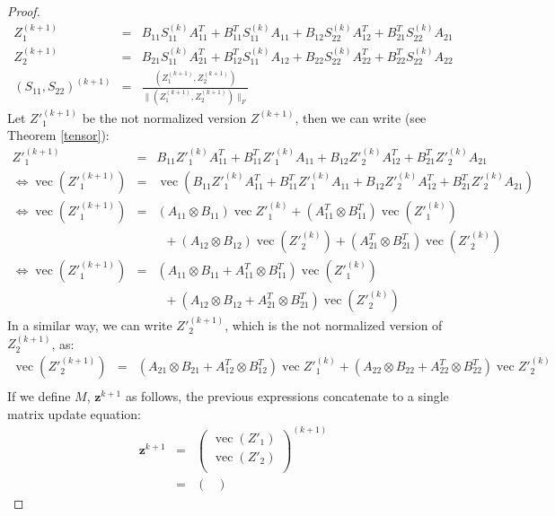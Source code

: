 \documentclass[a4paper,11pt]{report}
\newcommand{\vect}{\operatorname{vec}}
\begin{document}
\begin{proof}
\begin{eqnarray*}
  Z^{(k+1)}_1 &=& B_{11}S^{(k)}_{11}A_{11}^T + B^T_{11}S^{(k)}_{11}A_{11} + B_{12}S^{(k)}_{22}A_{12}^T + B^T_{21}S^{(k)}_{22}A_{21}\\
  Z^{(k+1)}_2 &=& B_{21}S^{(k)}_{11}A_{21}^T + B^T_{12}S^{(k)}_{11}A_{12} + B_{22}S^{(k)}_{22}A_{22}^T + B^T_{22}S^{(k)}_{22}A_{22} \\
 (S_{11}, S_{22})^{(k+1)} &=& \frac{(Z^{(k+1)}_1, Z^{(k+1)}_2)}{\|(Z^{(k+1)}_1, Z^{(k+1)}_2)\|_F}
 \end{eqnarray*}
Let $Z'^{(k+1)}_1$ be the not normalized version $Z^{(k+1)}$, then we can write (see Theorem \ref{tensor}):
\begin{eqnarray*}
  Z'^{(k+1)}_1 &=& B_{11}Z'^{(k)}_1A_{11}^T + B^T_{11}Z'^{(k)}_1A_{11} + B_{12}Z'^{(k)}_2A_{12}^T + B^T_{21}Z'^{(k)}_{2}A_{21}\\
 \Leftrightarrow \vect(Z'^{(k+1)}_1) &=& \vect(B_{11}Z'^{(k)}_1A_{11}^T + B^T_{11}Z'^{(k)}_1A_{11} + B_{12}Z'^{(k)}_2A_{12}^T + B^T_{21}Z'^{(k)}_{2}A_{21})\\
  \Leftrightarrow \vect(Z'^{(k+1)}_1) &=& (A_{11}\otimes B_{11})\vect{Z'^{(k)}_1}  
  + (A^T_{11}\otimes B^T_{11})\vect(Z'^{(k)}_1) \\
  && \;\; + (A_{12}\otimes B_{12})\vect(Z'^{(k)}_2)
  + (A^T_{21}\otimes B^T_{21})\vect(Z'^{(k)}_2) \\
  \Leftrightarrow \vect(Z'^{(k+1)}_1) &=& (A_{11}\otimes B_{11} + A^T_{11}\otimes B^T_{11})\vect(Z'^{(k)}_1)  \\ 
&&  \;\; + (A_{12}\otimes B_{12}+A^T_{21}\otimes B^T_{21})\vect(Z'^{(k)}_2)
 \end{eqnarray*}
 In a similar way, we can write $Z'^{(k+1)}_2$, which is the not normalized version of $Z^{(k+1)}_2$, as:
 \begin{eqnarray*}
 \vect(Z'^{(k+1)}_2) &=& (A_{21}\otimes B_{21} + A^T_{12}\otimes B^T_{12})\vect{Z'^{(k)}_1} + (A_{22}\otimes B_{22}+A^T_{22}\otimes B^T_{22})\vect{Z'^{(k)}_2}\\
\end{eqnarray*}
If we define $M$, $\mathbf{z}^{k+1}$ as follows, the previous expressions 
concatenate to a single matrix update equation:
\begin{eqnarray*}
\mathbf{z}^{k+1} &=& \begin{pmatrix}
\vect(Z'_1)\\
\vect(Z'_2)\\
\end{pmatrix}^{(k+1)}\\
&=& \begin{pmatrix}

\end{pmatrix}
\end{eqnarray*}
\end{proof}
\end{document}
